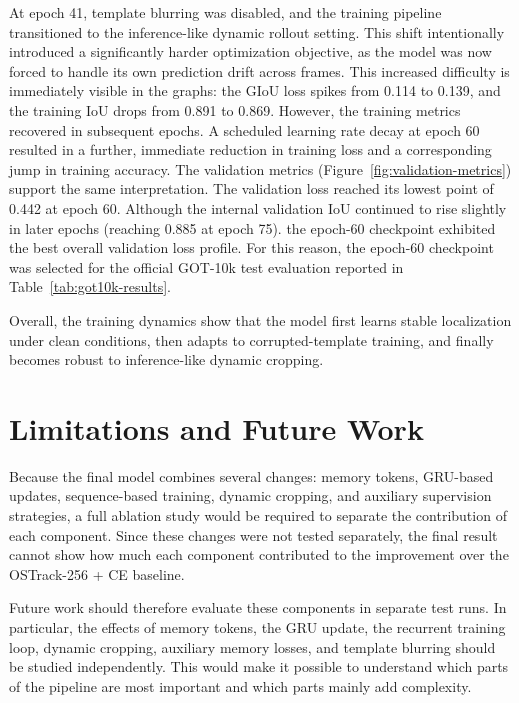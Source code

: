 \documentclass[bachelorthesis]{fer}
\numberwithin{equation}{chapter}
\begin{document}
    At epoch 41, template blurring was disabled, and the training pipeline transitioned to the inference-like dynamic
    rollout setting. This shift intentionally introduced a significantly harder optimization objective, as the model was now
    forced to handle its own prediction drift across frames. This increased difficulty is immediately visible in the graphs:
    the GIoU loss spikes from 0.114 to 0.139, and the training IoU drops from 0.891 to 0.869. However, the training metrics recovered in subsequent epochs. A scheduled learning rate decay at epoch 60 resulted in a further, immediate reduction in training loss and a corresponding jump in training accuracy.
    The validation metrics (Figure~\ref{fig:validation-metrics}) support the same interpretation. The validation loss reached its lowest point of 0.442 at
    epoch 60. Although the internal validation IoU continued to rise slightly in later epochs (reaching 0.885 at epoch 75).
    the epoch-60 checkpoint exhibited the best overall validation loss profile.
    For this reason, the epoch-60 checkpoint was selected for the official GOT-10k test evaluation reported in Table~\ref{tab:got10k-results}.


    Overall, the training dynamics show that the model first learns stable localization under clean conditions, then adapts to corrupted-template training, and finally becomes robust to inference-like dynamic cropping.


    \section{Limitations and Future Work}\label{limitations-and-future-work}

    Because the final model combines several changes: memory tokens, GRU-based updates, sequence-based training, dynamic cropping, and auxiliary supervision strategies, a full ablation study would be required to separate the contribution of each component.
    Since these changes were not tested separately,
    the final result cannot show how much each component contributed to the improvement over
    the OSTrack-256 + CE baseline.

    Future work should therefore evaluate these components in separate test runs. In
    particular, the effects of memory tokens, the GRU update, the recurrent training loop,
    dynamic cropping, auxiliary memory losses, and template blurring should be studied
    independently. This would make it possible to understand which parts of the pipeline are
    most important and which parts mainly add complexity.
\end{document}
